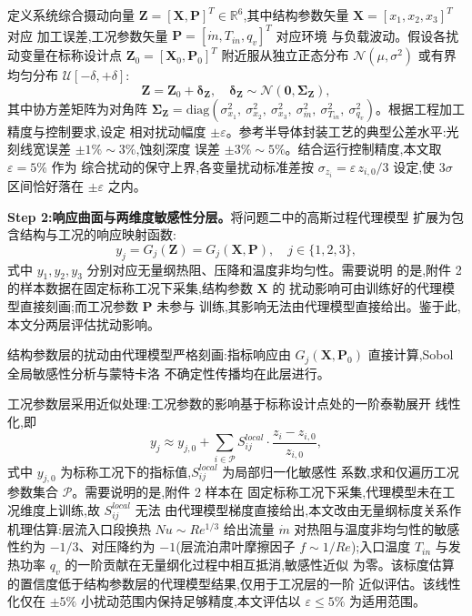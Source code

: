 定义系统综合摄动向量 $\mathbf{Z} = [\mathbf{X}, \mathbf{P}]^T \in
  \mathbb{R}^6$,其中结构参数矢量 $\mathbf{X} = [x_1, x_2, x_3]^T$ 对应
加工误差,工况参数矢量 $\mathbf{P} = [\dot{m}, T_{in}, q_v]^T$ 对应环境
与负载波动。假设各扰动变量在标称设计点
$\mathbf{Z}_0 = [\mathbf{X}_0, \mathbf{P}_0]^T$ 附近服从独立正态分布
$\mathcal{N}(\mu, \sigma^2)$ 或有界均匀分布 $\mathcal{U}[-\delta,
    +\delta]$:
\begin{equation}
  \mathbf{Z} = \mathbf{Z}_0 + \boldsymbol{\delta}_{\mathbf{Z}}, \quad
  \boldsymbol{\delta}_{\mathbf{Z}} \sim \mathcal{N}\left(\mathbf{0},
  \boldsymbol{\Sigma}_{\mathbf{Z}}\right),
  \label{eq:perturb}
\end{equation}
其中协方差矩阵为对角阵
$\boldsymbol{\Sigma}_{\mathbf{Z}} = \text{diag}(\sigma_{x_1}^2,\
  \sigma_{x_2}^2,\ \sigma_{x_3}^2,\ \sigma_{\dot{m}}^2,\
  \sigma_{T_{in}}^2,\ \sigma_{q_v}^2)$。根据工程加工精度与控制要求,设定
相对扰动幅度 $\pm \varepsilon$。参考半导体封装工艺的典型公差水平:光刻线宽误差 $\pm 1\%\sim3\%$,蚀刻深度
误差 $\pm 3\%\sim5\%$。结合运行控制精度,本文取 $\varepsilon = 5\%$ 作为
综合扰动的保守上界,各变量扰动标准差按
$\sigma_{z_i} = \varepsilon\,z_{i,0}/3$ 设定,使 $3\sigma$ 区间恰好落在
$\pm\varepsilon$ 之内。

\textbf{Step 2:响应曲面与两维度敏感性分层。}将问题二中的高斯过程代理模型
扩展为包含结构与工况的响应映射函数:
\begin{equation}
  y_j = G_j(\mathbf{Z}) = G_j(\mathbf{X}, \mathbf{P}), \quad
  j \in \{1, 2, 3\},
  \label{eq:gpr-extended}
\end{equation}
式中 $y_1, y_2, y_3$ 分别对应无量纲热阻、压降和温度非均匀性。需要说明
的是,附件 2 的样本数据在固定标称工况下采集,结构参数 $\mathbf{X}$ 的
扰动影响可由训练好的代理模型直接刻画;而工况参数 $\mathbf{P}$ 未参与
训练,其影响无法由代理模型直接给出。鉴于此,本文分两层评估扰动影响。

结构参数层的扰动由代理模型严格刻画:指标响应由
$G_j(\mathbf{X}, \mathbf{P}_0)$ 直接计算,Sobol 全局敏感性分析\cite{Sobol2001}与蒙特卡洛
不确定性传播\cite{McKay1979}均在此层进行。

工况参数层采用近似处理:工况参数的影响基于标称设计点处的一阶泰勒展开
线性化,即
\begin{equation}
  y_j \approx y_{j,0} + \sum_{i \in \mathcal{P}} S_{ij}^{local}
  \cdot \frac{z_i - z_{i,0}}{z_{i,0}},
  \label{eq:op-linear}
\end{equation}
式中 $y_{j,0}$ 为标称工况下的指标值,$S_{ij}^{local}$ 为局部归一化敏感性
系数,求和仅遍历工况参数集合 $\mathcal{P}$。需要说明的是,附件 2 样本在
固定标称工况下采集,代理模型未在工况维度上训练,故 $S_{ij}^{local}$ 无法
由代理模型梯度直接给出,本文改由无量纲标度关系作机理估算:层流入口段换热
$Nu \sim Re^{1/3}$ 给出流量 $\dot{m}$ 对热阻与温度非均匀性的敏感性约为
$-1/3$、对压降约为 $-1$(层流泊肃叶摩擦因子 $f \sim 1/Re$);入口温度
$T_{in}$ 与发热功率 $q_v$ 的一阶贡献在无量纲化过程中相互抵消,敏感性近似
为零。该标度估算的置信度低于结构参数层的代理模型结果,仅用于工况层的一阶
近似评估。该线性化仅在 $\pm 5\%$ 小扰动范围内保持足够精度,本文评估以
$\varepsilon \le 5\%$ 为适用范围。

